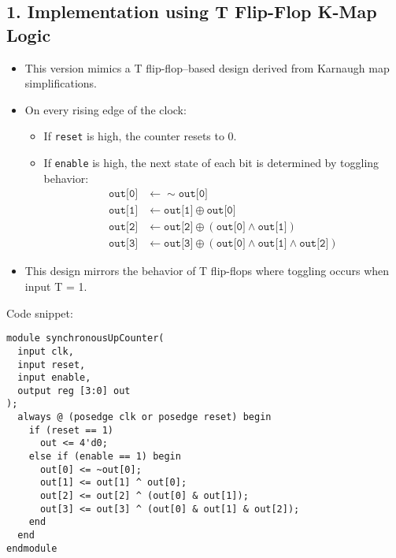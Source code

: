 \documentclass{article}
\begin{document}
\subsection*{1. Implementation using T Flip-Flop K-Map Logic}
\begin{itemize}
	\item This version mimics a T flip-flop–based design derived from Karnaugh map simplifications.
	\item On every rising edge of the clock:
	      \begin{itemize}
		      \item If \texttt{reset} is high, the counter resets to 0.
		      \item If \texttt{enable} is high, the next state of each bit is determined by toggling behavior:
		            \begin{align*}
			            \texttt{out[0]} & \leftarrow \sim \texttt{out[0]}                                                                 \\
			            \texttt{out[1]} & \leftarrow \texttt{out[1]} \oplus \texttt{out[0]}                                               \\
			            \texttt{out[2]} & \leftarrow \texttt{out[2]} \oplus (\texttt{out[0]} \land \texttt{out[1]})                       \\
			            \texttt{out[3]} & \leftarrow \texttt{out[3]} \oplus (\texttt{out[0]} \land \texttt{out[1]} \land \texttt{out[2]})
		            \end{align*}
	      \end{itemize}
	\item This design mirrors the behavior of T flip-flops where toggling occurs when input T = 1.
\end{itemize}

\noindent Code snippet:

\begin{lstlisting}
module synchronousUpCounter(
  input clk,
  input reset,
  input enable,
  output reg [3:0] out
);
  always @ (posedge clk or posedge reset) begin
    if (reset == 1)
      out <= 4'd0;
    else if (enable == 1) begin
      out[0] <= ~out[0];
      out[1] <= out[1] ^ out[0];
      out[2] <= out[2] ^ (out[0] & out[1]);
      out[3] <= out[3] ^ (out[0] & out[1] & out[2]);
    end
  end
endmodule
\end{lstlisting}
\end{document}
